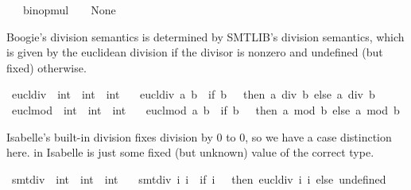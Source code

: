 \begin{isabellebody}
\ \ {\isacharbar}{\kern0pt}\ {\isachardoublequoteopen}binop{\isacharunderscore}{\kern0pt}mul\ {\isacharunderscore}{\kern0pt}\ {\isacharunderscore}{\kern0pt}\ {\isacharequal}{\kern0pt}\ None{\isachardoublequoteclose}%
\begin{isamarkuptext}%
Boogie's division semantics is determined by SMTLIB's division semantics, which is given
by the euclidean division if the divisor is nonzero and undefined (but fixed) otherwise.%
\end{isamarkuptext}\isamarkuptrue%
\isamarkupfalse%
\ eucl{\isacharunderscore}{\kern0pt}div\ {\isacharcolon}{\kern0pt}{\isacharcolon}{\kern0pt}\ {\isachardoublequoteopen}int\ {\isasymRightarrow}\ int\ {\isasymRightarrow}\ int{\isachardoublequoteclose}\ \isanewline
\ \ {\isachardoublequoteopen}eucl{\isacharunderscore}{\kern0pt}div\ a\ b\ {\isasymequiv}\ if\ b\ {\isachargreater}{\kern0pt}\ {}\ then\ a\ div\ b\ else\ {\isacharminus}{\kern0pt}{\isacharparenleft}{\kern0pt}a\ div\ {\isacharminus}{\kern0pt}b{\isacharparenright}{\kern0pt}{\isachardoublequoteclose}\isanewline
\isanewline
{}\isamarkupfalse%
\ eucl{\isacharunderscore}{\kern0pt}mod\ {\isacharcolon}{\kern0pt}{\isacharcolon}{\kern0pt}\ {\isachardoublequoteopen}int\ {\isasymRightarrow}\ int\ {\isasymRightarrow}\ int{\isachardoublequoteclose}\ \isanewline
\ \ {\isachardoublequoteopen}eucl{\isacharunderscore}{\kern0pt}mod\ a\ b\ {\isasymequiv}\ if\ b\ {\isachargreater}{\kern0pt}\ {}\ then\ a\ mod\ b\ else\ a\ mod\ {\isacharminus}{\kern0pt}b{\isachardoublequoteclose}%
\begin{isamarkuptext}%
Isabelle's built-in division fixes division by 0 to 0, so we have a case distinction here.
 in Isabelle is just some fixed (but unknown) value of the correct type.%
\end{isamarkuptext}\isamarkuptrue%
\isamarkupfalse%
\ smt{\isacharunderscore}{\kern0pt}div\ {\isacharcolon}{\kern0pt}{\isacharcolon}{\kern0pt}\ {\isachardoublequoteopen}int\ {\isasymRightarrow}\ int\ {\isasymRightarrow}\ int{\isachardoublequoteclose}\ \isanewline
\ \ {\isachardoublequoteopen}smt{\isacharunderscore}{\kern0pt}div\ i{}\ i{}\ {\isacharequal}{\kern0pt}\ {\isacharparenleft}{\kern0pt}if\ i{}\ {\isasymnoteq}\ {}\ then\ eucl{\isacharunderscore}{\kern0pt}div\ i{}\ i{}\ else\ undefined{\isacharparenright}{\kern0pt}{\isachardoublequoteclose}\isanewline

\end{isabellebody}
